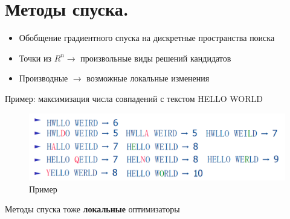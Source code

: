 \section{Методы спуска.}
\begin{itemize}
    \item Обобщение градиентного спуска на дискретные пространства поиска
    \item Точки из $R^n \to$  произвольные виды решений кандидатов
    \item Производные $\to$ возможные локальные изменения
\end{itemize}

Пример: максимизация числа совпадений с текстом HELLO WORLD
\begin{figure}[h]
\centering
\includegraphics[width=0.8\linewidth]{images/ms.png}
\caption{Пример}
\label{fig:mpr}
\end{figure}

Методы спуска тоже \textbf{локальные} оптимизаторы
